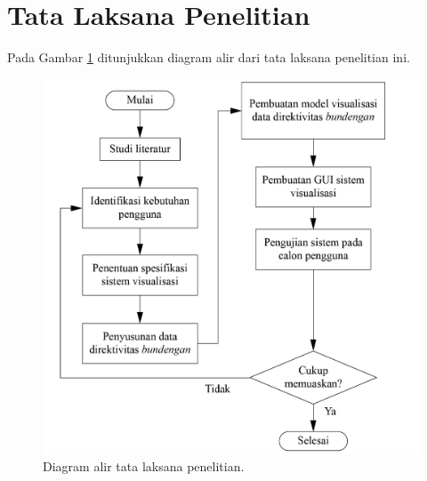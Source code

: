 \section{Tata Laksana Penelitian}
Pada Gambar \ref{fig:diagram-alir-penel} ditunjukkan diagram alir dari tata laksana penelitian ini. \par
\begin{figure}[t!]
    \centering
    \includegraphics[width=12cm]{Gambar/diagram alir 4_Diagram Alir Bab 4.jpg}
    \caption{Diagram alir tata laksana penelitian.}
    \label{fig:diagram-alir-penel}
\end{figure}
